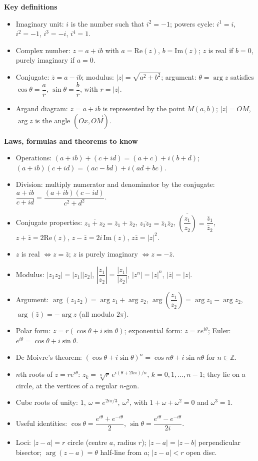 \documentclass[11pt]{article}
\newcommand{\cle}[1]{{\popxbold\color{popdark}#1}}
\begin{document}
\begin{bilan}

\textbf{Key definitions}
\begin{itemize}
\item \cle{Imaginary unit}: $i$ is the number such that $i^2=-1$; powers cycle: $i^1=i$, $i^2=-1$, $i^3=-i$, $i^4=1$.
\item \cle{Complex number}: $z=a+ib$ with $a=\mathrm{Re}(z)$, $b=\mathrm{Im}(z)$; $z$ is real if $b=0$, purely imaginary if $a=0$.
\item \cle{Conjugate}: $\bar z=a-ib$; \cle{modulus}: $|z|=\sqrt{a^2+b^2}$; \cle{argument}: $\theta=\arg z$ satisfies $\cos\theta=\dfrac{a}{r}$, $\sin\theta=\dfrac{b}{r}$, with $r=|z|$.
\item \cle{Argand diagram}: $z=a+ib$ is represented by the point $M(a,b)$; $|z|=OM$, $\arg z$ is the angle $(Ox, \overrightarrow{OM})$.
\end{itemize}

\textbf{Laws, formulas and theorems to know}
\begin{itemize}
\item Operations: $(a+ib)+(c+id)=(a+c)+i(b+d)$; $(a+ib)(c+id)=(ac-bd)+i(ad+bc)$.
\item Division: multiply numerator and denominator by the conjugate: $\dfrac{a+ib}{c+id}=\dfrac{(a+ib)(c-id)}{c^2+d^2}$.
\item Conjugate properties: $\overline{z_1+z_2}=\bar z_1+\bar z_2$, $\overline{z_1z_2}=\bar z_1\bar z_2$, $\overline{\left(\dfrac{z_1}{z_2}\right)}=\dfrac{\bar z_1}{\bar z_2}$, $z+\bar z=2\mathrm{Re}(z)$, $z-\bar z=2i\,\mathrm{Im}(z)$, $z\bar z=|z|^2$.
\item $z$ is real $\iff z=\bar z$; $z$ is purely imaginary $\iff z=-\bar z$.
\item Modulus: $|z_1z_2|=|z_1||z_2|$, $\left|\dfrac{z_1}{z_2}\right|=\dfrac{|z_1|}{|z_2|}$, $|z^n|=|z|^n$, $|\bar z|=|z|$.
\item Argument: $\arg(z_1z_2)=\arg z_1+\arg z_2$, $\arg\!\left(\dfrac{z_1}{z_2}\right)=\arg z_1-\arg z_2$, $\arg(\bar z)=-\arg z$ (all modulo $2\pi$).
\item Polar form: $z=r(\cos\theta+i\sin\theta)$; exponential form: $z=re^{i\theta}$; Euler: $e^{i\theta}=\cos\theta+i\sin\theta$.
\item \cle{De Moivre's theorem}: $(\cos\theta+i\sin\theta)^n=\cos n\theta+i\sin n\theta$ for $n\in\mathbb{Z}$.
\item $n$th roots of $z=re^{i\theta}$: $z_k=\sqrt[n]{r}\,e^{i(\theta+2k\pi)/n}$, $k=0,1,\dots,n-1$; they lie on a circle, at the vertices of a regular $n$-gon.
\item Cube roots of unity: $1,\ \omega=e^{2i\pi/3},\ \omega^2$, with $1+\omega+\omega^2=0$ and $\omega^3=1$.
\item Useful identities: $\cos\theta=\dfrac{e^{i\theta}+e^{-i\theta}}{2}$, $\sin\theta=\dfrac{e^{i\theta}-e^{-i\theta}}{2i}$.
\item Loci: $|z-a|=r$ circle (centre $a$, radius $r$); $|z-a|=|z-b|$ perpendicular bisector; $\arg(z-a)=\theta$ half-line from $a$; $|z-a|<r$ open disc.
\end{itemize}


\end{bilan}
\end{document}

